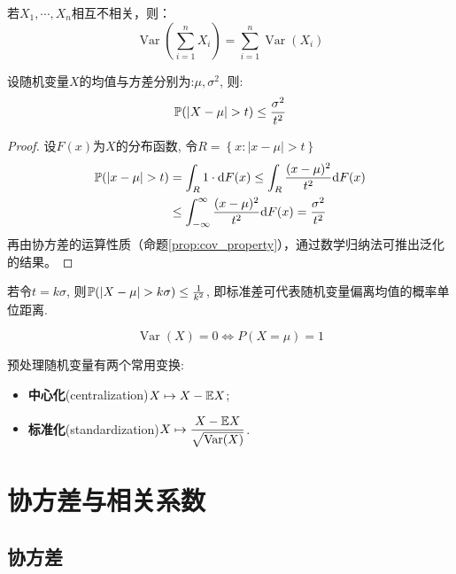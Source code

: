 \begin{corollary}
    若$X_1,\cdots ,X_n$相互不相关，则：
    \[ \operatorname{Var}(\sum_{i=1}^n X_i)=\sum_{i=1}^n\operatorname{Var}(X_i) \]
\end{corollary}

\begin{theorem}[Chebyshev不等式]
    设随机变量$X$的均值与方差分别为:$\mu, \sigma^2$, 则:
    \[ \P(\left| X-\mu \right| >t)\le \frac{\sigma^{2}}{t^{2}} \]
\end{theorem}

\begin{proof}
    设$F(x)$为$X$的分布函数, 令$R=\left\{ x:|x-\mu|>t \right\}$
    \begin{align*}
        \P(|x-\mu|>t) & = \int_R 1 \cdot  \d F(x) \le \int_R \frac{(x-\mu)^2}{t^{2}}\d F(x)                   \\
                      & \le \int_{-\infty}^{\infty}\frac{(x-\mu)^2}{t^{2}}\d F(x)  = \frac{\sigma^{2}}{t^{2}}
    \end{align*}
    再由协方差的运算性质（命题\ref{prop:cov_property}），通过数学归纳法可推出泛化的结果。
\end{proof}

\begin{remark}
    若令$t=k\sigma$, 则$\P(| X-\mu | >k\sigma)\le \frac1{k^{2}}$, 即标准差可代表随机变量偏离均值的概率单位距离.
\end{remark}

\begin{corollary}\label{cor:var_almost_equal}
    \[ \operatorname{Var}(X)=0 \Leftrightarrow P(X=\mu)=1 \]
\end{corollary}

预处理随机变量有两个常用变换:
\begin{itemize}
    \item \textbf{中心化}(centralization)$X \mapsto X-\E{X}$;
    \item \textbf{标准化}(standardization)$X \mapsto \dfrac{X-\E{X}}{\sqrt{\Var(X)}}$.
\end{itemize}

\section{协方差与相关系数}

\subsection{协方差}

